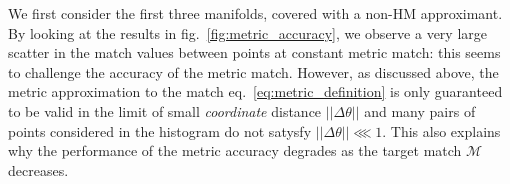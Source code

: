 \documentclass[twocolumn,showpacs,preprintnumbers,nofootinbib,prd,
superscriptaddress,10pt]{revtex4-2}
\begin{document}

We first consider the first three manifolds, covered with a non-HM approximant.
By looking at the results in fig.~\ref{fig:metric_accuracy}, we observe a very large scatter in the match values between points at constant metric match: this seems to challenge the accuracy of the metric match.
However, as discussed above, the metric approximation to the match eq.~\eqref{eq:metric_definition} is only guaranteed to be valid in the limit of small {\it coordinate} distance $||\Delta\theta||$ and many pairs of points considered in the histogram do not satysfy $||\Delta\theta||\lll 1$. This also explains why the performance of the metric accuracy degrades as the target match $\mathcal{M}$ decreases.
\end{document}
